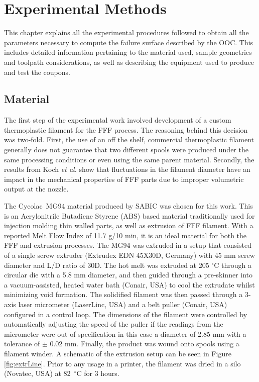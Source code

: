 \documentclass[main.tex]{subfiles}
\begin{document}
\chapter{Experimental Methods} \label{ch:exp}
This chapter explains all the experimental procedures followed to obtain all the parameters necessary to compute the failure surface described by the OOC. This includes detailed information pertaining to the material used, sample geometries and toolpath considerations, as well as describing the equipment used to produce and test the coupons.   

\section{Material} \label{sec:material}

The first step of the experimental work involved development of a custom thermoplastic filament for the FFF process. The reasoning behind this decision was two-fold. First, the use of an off the shelf, commercial thermoplastic filament generally does not guarantee that two different spools were produced under the same processing conditions \textemdash or even using the same parent material. Secondly, the results from Koch \emph{et al.} \cite{Koch2017} show that fluctuations in the filament diameter have an impact in the mechanical properties of FFF parts due to improper volumetric output at the nozzle.

The Cycolac\texttrademark~MG94 material produced by SABIC was chosen for this work. This is an Acrylonitrile Butadiene Styrene (ABS) based material traditionally used for injection molding thin walled parts, as well as extrusion of FFF filament. With a reported Melt Flow Index of 11.7 g/10 min, it is an ideal material for both the FFF and extrusion processes. The MG94 was extruded in a setup that consisted of a single screw extruder (Extrudex EDN 45X30D, Germany) with 45 mm screw diameter and L/D ratio of 30D. The hot melt was extruded at 205 $^\circ$C through a circular die with a 5.8 mm diameter, and then guided through a pre-skinner into a vacuum-assisted, heated water bath (Conair, USA) to cool the extrudate whilst minimizing void formation. The solidified filament was then passed through a 3-axis laser micrometer (LaserLinc, USA) and a belt puller (Conair, USA) configured in a control loop. The dimensions of the filament were controlled by automatically adjusting the speed of the puller if the readings from the micrometer were out of specification \textemdash in this case a diameter of 2.85 mm with a tolerance of $\pm$ 0.02 mm. Finally, the product was wound onto spools using a filament winder. A schematic of the extrusion setup can be seen in Figure \ref{fig:extrLine}. Prior to any usage in a printer, the filament was dried in a silo (Novatec, USA) at 82~$^\circ$C for 3 hours.
\end{document}
